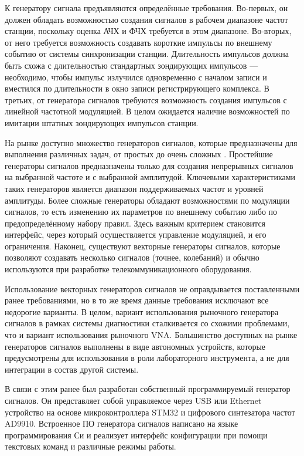 \documentclass{report}
\begin{document}
К генератору сигнала предъявляются определённые требования. Во-первых, он должен обладать возможностью создания сигналов в рабочем диапазоне частот станции, поскольку оценка АЧХ и ФЧХ требуется в этом диапазоне. Во-вторых, от него требуется возможность создавать короткие импульсы по внешнему событию от системы синхронизации станции. Длительность импульсов должна быть схожа с длительностью стандартных зондирующих импульсов --- необходимо, чтобы импульс излучился одновременно с началом записи и вместился по длительности в окно записи регистрирующего комплекса. В третьих, от генератора сигналов требуются возможность создания импульсов с линейной частотной модуляцией. В целом ожидается наличие возможностей по имитации штатных зондирующих импульсов станции.


На рынке доступно множество генераторов сигналов, которые предназначены для выполнения различных задач, от простых до очень сложных \cite{siggen1}. Простейшие генераторы сигналов предназначены только для создания непрерывных сигналов на выбранной частоте и с выбранной амплитудой. Ключевыми характеристиками таких генераторов является диапазон поддерживаемых частот и уровней амплитуды. Более сложные генераторы обладают возможностями по модуляции сигналов, то есть изменению их параметров по внешнему событию либо по предопределённому набору правил. Здесь важным критерием становится интерфейс, через который осуществляется управление модуляцией, и его ограничения. Наконец, существуют векторные генераторы сигналов, которые позволяют создавать несколько сигналов (точнее, колебаний) и обычно используются при разработке телекоммуникационного оборудования.

Использование векторных генераторов сигналов не оправдывается поставленными ранее требованиями, но в то же время данные требования исключают все недорогие варианты. В целом, вариант использования рыночного генератора сигналов в рамках системы диагностики сталкивается со схожими проблемами, что и вариант использования рыночного VNA. Большинство доступных на рынке генераторов сигналов выполнены в виде автономных устройств, которые предусмотрены для использования в роли лабораторного инструмента, а не для интеграции в состав другой системы.

В связи с этим ранее был разработан собственный программируемый генератор сигналов. Он представляет собой управляемое через USB или Ethernet устройство на основе микроконтроллера STM32 и цифрового синтезатора частот AD9910. Встроенное ПО генератора сигналов написано на языке программирования Си и реализует интерфейс конфигурации при помощи текстовых команд и различные режимы работы.
\end{document}
